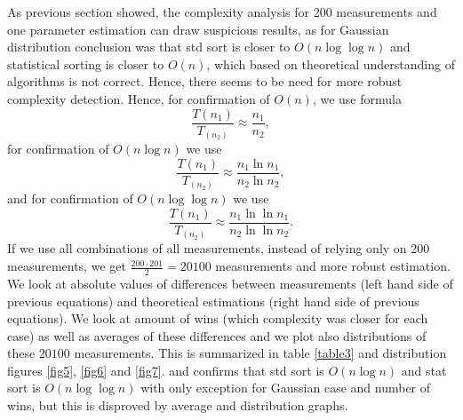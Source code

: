 \documentclass[12pt]{article}
\begin{document}
    As previous section showed, the complexity analysis for 200 measurements and one parameter estimation can draw suspicious results, as for Gaussian distribution conclusion was that std sort is closer to $O(n \log \log n)$ and statistical sorting is closer to $O(n)$, which based on theoretical understanding of algorithms is not correct. Hence, there seems to be need for more robust complexity detection. Hence, for confirmation of $O(n)$, we use formula
    \[
    \frac{T(n_1)}{T_(n_2)} \approx \frac{n_1}{n_2},
    \]
    for confirmation of $O(n \log n)$ we use
    \[
    \frac{T(n_1)}{T_(n_2)} \approx \frac{n_1 \ln n_1}{n_2 \ln n_2},
    \]
    and for confirmation of $O(n \log \log n)$ we use
    \[
    \frac{T(n_1)}{T_(n_2)} \approx \frac{n_1 \ln \ln n_1}{n_2 \ln \ln n_2}.
    \]
    If we use all combinations of all measurements, instead of relying only on 200 measurements, we get $\frac{200 \cdot 201}{2} = 20100$ measurements and more robust estimation. We look at absolute values of differences between measurements (left hand side of previous equations) and theoretical estimations (right hand side of previous equations). We look at amount of wins (which complexity was closer for each case) as well as averages of these differences and we plot also distributions of these $20100$ measurements. This is summarized in table \ref{table3} and distribution figures \ref{fig5}, \ref{fig6} and \ref{fig7}. and confirms that std sort is $O(n \log n)$ and stat sort is $O(n \log \log n)$ with only exception for Gaussian case and number of wins, but this is disproved by average and distribution graphs.
\end{document}
